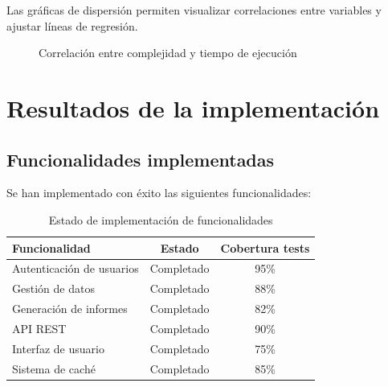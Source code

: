 Las gráficas de dispersión permiten visualizar correlaciones entre variables y ajustar líneas de regresión.

\begin{figure}[htbp]
  \centering
  \caption{Correlación entre complejidad y tiempo de ejecución}
  \label{fig:scatter}
\end{figure}

\section{Resultados de la implementación}
\label{sec:resultados-implementacion}

\subsection{Funcionalidades implementadas}
\label{subsec:funcionalidades}

Se han implementado con éxito las siguientes funcionalidades:

\begin{table}[htbp]
  \centering
  \caption{Estado de implementación de funcionalidades}
  \label{tab:funcionalidades}
  \EPScabeceraTabla
  \begin{tabular}{@{}lcc@{}}
    \toprule
    \textbf{Funcionalidad} & \textbf{Estado} & \textbf{Cobertura tests} \\
    \midrule
    Autenticación de usuarios & Completado & 95\% \\
    Gestión de datos & Completado & 88\% \\
    Generación de informes & Completado & 82\% \\
    API REST & Completado & 90\% \\
    Interfaz de usuario & Completado & 75\% \\
    Sistema de caché & Completado & 85\% \\
    \bottomrule
  \end{tabular}
\end{table}

